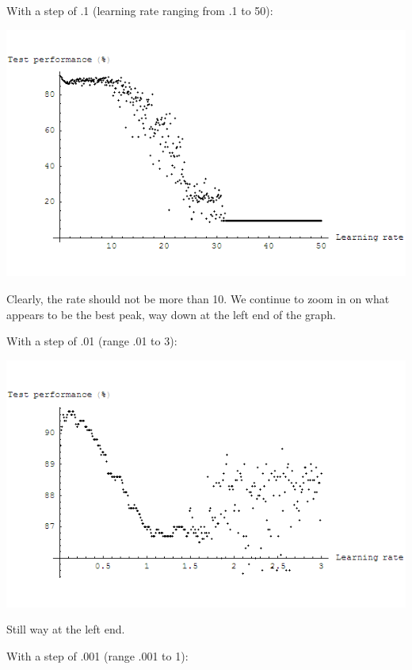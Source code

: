 \documentclass{article}
\begin{document}
\begin{enumerate}
\begin{enumerate}

      With a step of .1 (learning rate ranging from .1 to 50):

      \begin{center}
        \includegraphics[scale=.5]{plot_test_1.png}
      \end{center}

      Clearly, the rate should not be more than 10. We continue to
      zoom in on what appears to be the best peak, way down at the
      left end of the graph.

      With a step of .01 (range .01 to 3):

      \begin{center}
        \includegraphics[scale=.5]{plot_test_01.png}
      \end{center}

      Still way at the left end.

      With a step of .001 (range .001 to 1):


\end{enumerate}
\end{enumerate}
\end{document}

